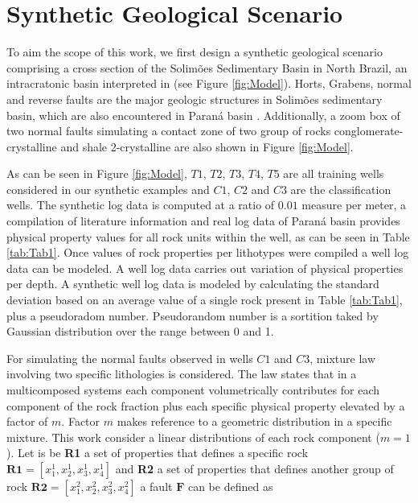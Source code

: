 \documentclass[preprint,12pt]{elsarticle}
\begin{document}


\section{Synthetic Geological Scenario}
\label{sec:SynGeo}
To aim the scope of this work, we first design a synthetic geological scenario comprising a cross section of the Solim\~oes Sedimentary Basin in North Brazil, an intracratonic basin interpreted in \cite{Sal2008} (see Figure \ref{fig:Model}). Horts, Grabens, normal and reverse faults are the major geologic structures in Solim\~oes sedimentary basin, which are also encountered in Paran\'a basin \cite{Zanotto_1993, Zalan2007}.  
Additionally, a zoom box of two normal faults simulating a contact zone of two group of rocks conglomerate-crystalline and shale 2-crystalline are also shown in Figure \ref{fig:Model}.

As can be seen in Figure \ref{fig:Model}, $T1$, $T2$, $T3$, $T4$, $T5$ are all training wells considered in our synthetic examples and $C1$, $C2$ and $C3$ are the classification wells. The synthetic log data is computed at a ratio of $0.01$ measure per meter, a compilation of literature information \citep{bassiouni1994} and real log data of Paran\'a basin provides physical property values for all rock units within the well, as can be seen in Table \ref{tab:Tab1}.  Once values of rock properties per lithotypes were compiled a well log data can be modeled. A well log data carries out variation of physical properties per depth. A synthetic well log data is modeled by calculating the standard deviation based on an average value of a single rock present in Table \ref{tab:Tab1}, plus a pseudoradom number. Pseudorandom number is a sortition taked by Gaussian distribution over the range between 0 and 1.   

For simulating the normal faults observed in wells $C1$ and $C3$, mixture law \citep{nery2013} involving two specific lithologies is considered. The law states that in a multicomposed systems each component volumetrically contributes for each component of the rock fraction plus each specific physical property elevated by a factor of $m$. Factor $m$ makes reference to a geometric distribution in a specific mixture. This work consider a linear distributions of each rock component ($m=1$). Let is be \textbf{R1} a set of properties that defines a specific rock $\textbf{R1}=[x_{1}^{1}, x_{2}^{1}, x_{3}^{1}, x_{4}^{1}]$ and \textbf{R2} a set of properties that defines another group of rock $\textbf{R2}=[x_{1}^{2}, x_{2}^{2}, x_{3}^{2}, x_{4}^{2}]$ a fault $\textbf{F}$ can be defined as
\end{document}
